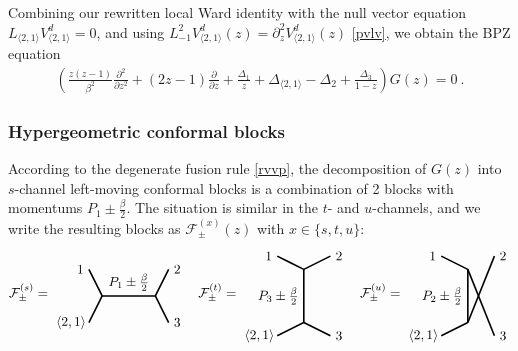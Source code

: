 \documentclass[12pt, a4paper]{article}
\theoremstyle{break}
\begin{document}
Combining our rewritten local Ward identity with the null vector equation $L_{\langle 2,1\rangle}V^d_{\langle 2,1\rangle}=0$, and using $L_{-1}^2 V^d_{\langle 2,1\rangle}(z) = \partial_z^2 V^d_{\langle 2,1\rangle}(z)$ \eqref{pvlv}, we obtain the BPZ equation 
\begin{align}
 \left(\frac{z(z-1)}{\beta^2}\frac{\partial^2}{\partial z^2} + (2z-1)\frac{\partial}{\partial z} + \frac{\Delta_1}{z} + \Delta_{\langle 2,1\rangle}-\Delta_2  +\frac{\Delta_3}{1-z} \right) G(z) = 0 \ .
\end{align}

\subsubsection{Hypergeometric conformal blocks}

According to the degenerate fusion rule \eqref{rvvp}, the decomposition of $G(z)$ into $s$-channel left-moving conformal blocks is a combination of 2 blocks with momentums $P_1\pm \frac{\beta}{2}$. The situation is similar in the $t$- and $u$-channels, and we write the resulting blocks as $\mathcal{F}^{(x)}_\pm(z)$ with $x\in\{s,t,u\}$:
\begin{align}
\mathcal{F}^{(s)}_\pm = 
 \begin{tikzpicture}[baseline=(current  bounding  box.center), very thick, scale = .35]
\draw (-1,2) node [left] {$1$} -- (0,0) -- node [above] {$P_1\pm\frac{\beta}{2}$} (4,0) -- (5,2) node [right] {$2$};
\draw (-1,-2) node [left] {$\langle 2,1\rangle\!$} -- (0,0);
\draw (4,0) -- (5,-2) node [right] {$3$};
\end{tikzpicture}
\quad 
\mathcal{F}^{(t)}_\pm = 
\begin{tikzpicture}[baseline=(current  bounding  box.center), very thick, scale = .35]
 \draw (-2,3) node [left] {$1$} -- (0,2) -- node [left] {$P_3\pm\frac{\beta}{2}$} (0,-2) -- (-2, -3) node [left] {$\langle 2,1\rangle\!$};
\draw (0,2) -- (2,3) node [right] {$2$};
\draw (0,-2) -- (2, -3) node [right] {$3$};
\end{tikzpicture}
\quad 
\mathcal{F}^{(u)}_\pm = 
\begin{tikzpicture}[baseline=(current  bounding  box.center), very thick, scale = .35]
\draw (-2,1) node [left] {$1$} -- (0,0) -- node [left] {$P_2\pm \frac{\beta}{2}$} (0,-4) ;
\draw (0,0)-- (2,-5) node [right] {$3$};
\draw (-2,-5) node [left] {$\langle 2,1\rangle\!$} -- (0,-4);
\draw (0,-4) -- (2,1) node [right] {$2$};
\end{tikzpicture} 
\end{align}
\end{document}
